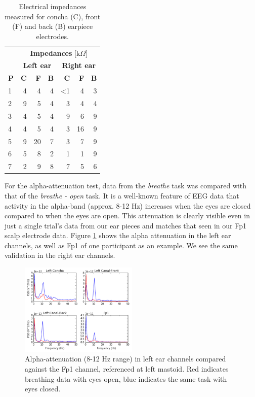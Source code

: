 \documentclass{sigchi}
\begin{document}
\begin{table}[h]
\begin{center}
\begin{tabular}{lrrrrrr}
& \multicolumn{6}{c}{\textbf{Impedances} [k\(\Omega\)]} \\
\cline{2-7}
& \multicolumn{3}{|c|}{\textbf{Left ear}} & \multicolumn{3}{c|}{\textbf{Right ear}} \\
\textbf{P} & \textbf{C} & \textbf{F} & \textbf{B} & \textbf{C} & \textbf{F} & \textbf{B} \\
\hline
1 & 4 & 4 & 4 & \textless1 & 4 & 3\\
2 & 9 & 5 & 4 & 3 & 4 & 4\\
3 & 4 & 5 & 4 & 9 & 6 & 9\\
4 & 4 & 5 & 4 & 3 & 16 & 9\\
5 & 9 & 20 & 7 & 3 & 7 & 9\\
6 & 5 & 8 & 2 & 1 & 1 & 9\\
7 & 2 & 9 & 8 & 7 & 5 & 6\\
\end{tabular}
\end{center}
\caption{Electrical impedances measured for concha (C), front (F) and back (B) earpiece electrodes.}
\label{tab:impedances}
\end{table}

For the alpha-attenuation test, data from the \textit{breathe} task was compared with that of the \textit{breathe - open} task. It is a well-known feature of EEG data that activity in the alpha-band (approx. 8-12 Hz) increases when the eyes are closed compared to when the eyes are open. This attenuation is clearly visible even in just a single trial's data from our ear pieces and matches that seen in our Fp1 scalp electrode data. Figure \ref{fig:alpha_atten} shows the alpha attenuation in the left ear channels, as well as Fp1 of one participant as an example. We see the same validation in the right ear channels.

\begin{figure}[h]
\centering
\includegraphics[width=0.5\textwidth]{figures/002_AlphaAtt_all.jpg}
\caption{Alpha-attenuation (8-12 Hz range) in left ear channels compared against the Fp1 channel, referenced at left mastoid. Red indicates breathing data with eyes open, blue indicates the same task with eyes closed.}
\label{fig:alpha_atten}
\end{figure}
\end{document}
